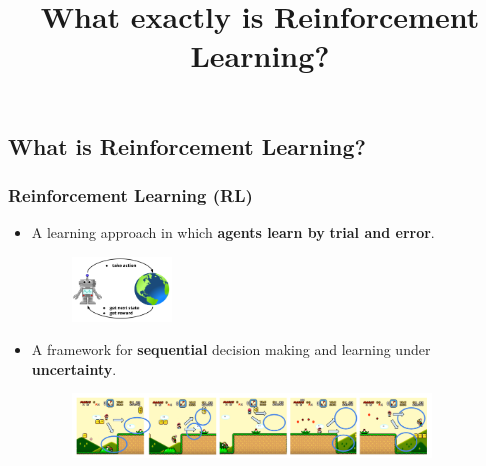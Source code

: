 


\subsection{What is Reinforcement Learning?} \title{What exactly is Reinforcement Learning?} \author{} \date{}
\begin{frame}[plain,c]
    \titlepage
\end{frame}

\begin{frame}
    \frametitle{Reinforcement Learning (RL)}
    \begin{itemize}
        \item A learning approach in which \textbf{agents learn by}
              \textbf{trial and error}.
            \begin{figure}
                \centering
                \includegraphics[width=0.25\textwidth]{./imgs/img_rl_environment_agent.png}
            \end{figure}
        \pause
        \item A framework for \textbf{sequential} decision making and learning under
              \textbf{uncertainty}.
            \begin{figure}
                \centering
                \includegraphics[width=0.9\textwidth]{./imgs/img_sequential_mario.png}
            \end{figure}
    \end{itemize}
\end{frame}

